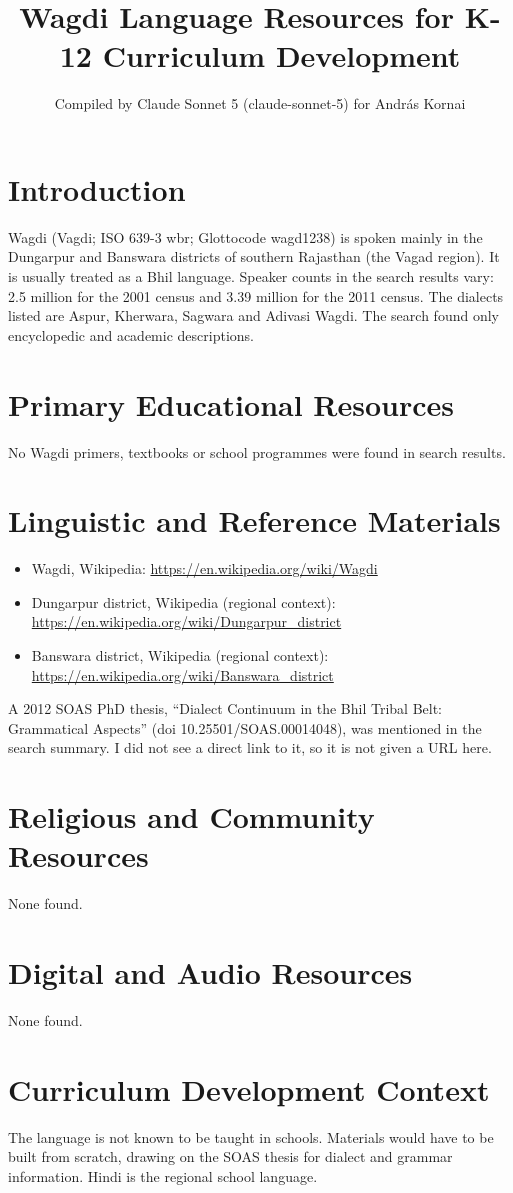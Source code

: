 \documentclass[12pt]{article}
\title{Wagdi Language Resources for K-12 Curriculum Development}
\author{Compiled by Claude Sonnet 5 (claude-sonnet-5) for Andr\'as Kornai}
\date{}
\begin{document}
\maketitle

\section{Introduction}
Wagdi (Vagdi; ISO 639-3 wbr; Glottocode wagd1238) is spoken mainly in the Dungarpur and Banswara districts of southern Rajasthan (the Vagad region). It is usually treated as a Bhil language. Speaker counts in the search results vary: 2.5 million for the 2001 census and 3.39 million for the 2011 census. The dialects listed are Aspur, Kherwara, Sagwara and Adivasi Wagdi. The search found only encyclopedic and academic descriptions.

\section{Primary Educational Resources}
No Wagdi primers, textbooks or school programmes were found in search results.

\section{Linguistic and Reference Materials}
\begin{itemize}
\item Wagdi, Wikipedia: \url{https://en.wikipedia.org/wiki/Wagdi}
\item Dungarpur district, Wikipedia (regional context): \url{https://en.wikipedia.org/wiki/Dungarpur_district}
\item Banswara district, Wikipedia (regional context): \url{https://en.wikipedia.org/wiki/Banswara_district}
\end{itemize}
A 2012 SOAS PhD thesis, ``Dialect Continuum in the Bhil Tribal Belt: Grammatical Aspects'' (doi 10.25501/SOAS.00014048), was mentioned in the search summary. I did not see a direct link to it, so it is not given a URL here.

\section{Religious and Community Resources}
None found.

\section{Digital and Audio Resources}
None found.

\section{Curriculum Development Context}
The language is not known to be taught in schools. Materials would have to be built from scratch, drawing on the SOAS thesis for dialect and grammar information. Hindi is the regional school language.
\end{document}
